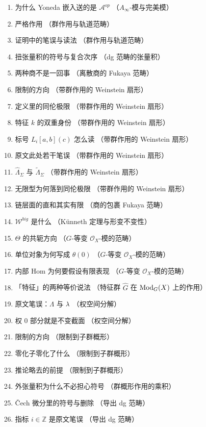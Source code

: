 \begin{enumerate}[label={译注 \arabic*：},leftmargin=2.8cm,itemsep=1pt]
\item 为什么 Yoneda 嵌入送的是 $\mathcal{A}^{op}$ \quad（$A_{\infty}$-模与完美模）
\item 严格作用 \quad（群作用与轨道范畴）
\item 证明中的笔误与读法 \quad（群作用与轨道范畴）
\item 扭张量积的符号与复合次序 \quad（dg 范畴的张量积）
\item 两种商不是一回事 \quad（离散商的 Fukaya 范畴）
\item 限制的方向 \quad（带群作用的 Weinstein 扇形）
\item 定义里的同伦极限 \quad（带群作用的 Weinstein 扇形）
\item 特征 $k$ 的双重身份 \quad（带群作用的 Weinstein 扇形）
\item 标号 $L_i[a,b](c)$ 怎么读 \quad（带群作用的 Weinstein 扇形）
\item 原文此处若干笔误 \quad（带群作用的 Weinstein 扇形）
\item $\widehat{\Lambda}_{\Sigma}$ 与 $\widetilde{\Lambda}_{\Sigma}$ \quad（带群作用的 Weinstein 扇形）
\item 无限型为何落到同伦极限 \quad（带群作用的 Weinstein 扇形）
\item 链层面的直和其实有限 \quad（商的包裹 Fukaya 范畴）
\item $\mathcal{W}^{big}$ 是什么 \quad（K\"unneth 定理与形变不变性）
\item $\Theta$ 的共轭方向 \quad（$G$-等变 $\mathcal{O}_X$-模的范畴）
\item 单位对象为何写成 $\theta(0)$ \quad（$G$-等变 $\mathcal{O}_X$-模的范畴）
\item 内部 Hom 为何要假设有限表现 \quad（$G$-等变 $\mathcal{O}_X$-模的范畴）
\item 「特征」的两种等价说法 \quad（特征群 $\widehat{G}$ 在 $\operatorname{\mathrm{Mod}}_G(X)$ 上的作用）
\item 原文笔误：$\Lambda$ 与 $\operatorname{\lambda}$ \quad（权空间分解）
\item 权 $0$ 部分就是不变截面 \quad（权空间分解）
\item 限制的方向 \quad（限制到子群概形）
\item 零化子零化了什么 \quad（限制到子群概形）
\item 推论略去的前提 \quad（限制到子群概形）
\item 外张量积为什么不必担心符号 \quad（群概形作用的乘积）
\item Čech 微分里的符号与删除 \quad（导出 dg 范畴）
\item 指标 $i\in\mathbb{Z}$ 是原文笔误 \quad（导出 dg 范畴）

\end{enumerate}
